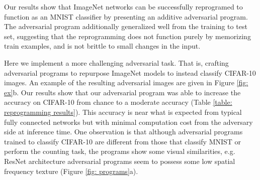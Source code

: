 \documentclass{article}
\begin{document}
Our results show that ImageNet networks can be successfully reprogramed to function as an MNIST classifier by presenting an additive adversarial program. 
The adversarial program additionally generalized well from the training to test set, suggesting that the reprogramming does not function purely by memorizing train examples, and is not brittle to small changes in the input. 

Here we implement a more challenging adversarial task. That is, crafting adversarial programs to repurpose ImageNet models to instead classify CIFAR-10 images. 
An example of the resulting adversarial images are given in Figure \ref{fig: ex}b.
Our results show that our adversarial program was able to increase the accuracy on CIFAR-10 from chance to a moderate accuracy (Table \ref{table: reprogramming results}). This accuracy is near what is expected from typical fully connected networks \citep{lin2015far} but with minimal computation cost from the adversary side at inference time. 
One observation is that although adversarial programs trained to classify CIFAR-10 are different from those that classify MNIST or perform the counting task, the programs show some visual similarities, e.g. ResNet architecture adversarial programs seem to possess some low spatial frequency texture (Figure \ref{fig: programs}a).
\end{document}
